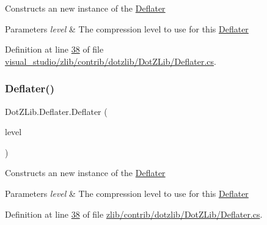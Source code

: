 Constructs an new instance of the {\ttfamily \hyperlink{class_dot_z_lib_1_1_deflater}{Deflater}} 


\begin{DoxyParams}{Parameters}
{\em level} & The compression level to use for this {\ttfamily \hyperlink{class_dot_z_lib_1_1_deflater}{Deflater}}\\
\hline
\end{DoxyParams}


Definition at line \hyperlink{visual__studio_2zlib_2contrib_2dotzlib_2_dot_z_lib_2_deflater_8cs_source_l00038}{38} of file \hyperlink{visual__studio_2zlib_2contrib_2dotzlib_2_dot_z_lib_2_deflater_8cs_source}{visual\+\_\+studio/zlib/contrib/dotzlib/\+Dot\+Z\+Lib/\+Deflater.\+cs}.

\mbox{\label{class_dot_z_lib_1_1_deflater_a3af92869710011e866633c2186c7cab1}} 
\subsubsection{\texorpdfstring{Deflater()}{Deflater()}\hspace{0.1cm}{\footnotesize\ttfamily [2/2]}}
{\footnotesize\ttfamily Dot\+Z\+Lib.\+Deflater.\+Deflater (\begin{DoxyParamCaption}\item[{\hyperlink{namespace_dot_z_lib_a034f7a1ef9856d8834e6f6b1c53d8a4c}{Compress\+Level}}]{level }\end{DoxyParamCaption})\hspace{0.3cm}{\ttfamily [inline]}}



Constructs an new instance of the {\ttfamily \hyperlink{class_dot_z_lib_1_1_deflater}{Deflater}} 


\begin{DoxyParams}{Parameters}
{\em level} & The compression level to use for this {\ttfamily \hyperlink{class_dot_z_lib_1_1_deflater}{Deflater}}\\
\hline
\end{DoxyParams}


Definition at line \hyperlink{zlib_2contrib_2dotzlib_2_dot_z_lib_2_deflater_8cs_source_l00038}{38} of file \hyperlink{zlib_2contrib_2dotzlib_2_dot_z_lib_2_deflater_8cs_source}{zlib/contrib/dotzlib/\+Dot\+Z\+Lib/\+Deflater.\+cs}.



